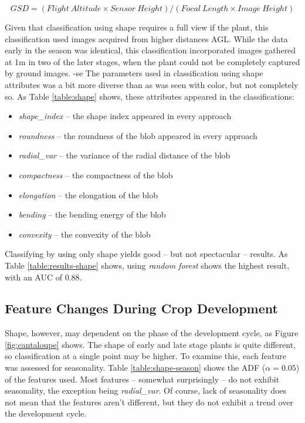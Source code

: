 \documentclass[letterpaper]{report}
\begin{document}
\begin{equation}
\label{eqn:gsd}
GSD = (Flight\ Altitude \times Sensor\ Height) / (Focal\ Length \times Image\ Height)
\end{equation}

Given that classification using shape requires a full view if the plant, this classification used images acquired from higher distances AGL. While the data early in the season was identical, this classification incorporated images gathered at 1m in two of the later stages, when the plant could not be completely captured by ground images.
-se
The parameters used in classification using shape attributes was a bit more diverse than as was seen with color, but not completely so. As Table \ref{table:shape} shows, these attributes appeared in the classifications:
\begin{itemize}
	\item{\textit{shape\_index} -- the shape index appeared in every approach}
	\item{\textit{roundness} -- the roundness of the blob appeared in every approach}
	\item{\textit{radial\_var} -- the variance of the radial distance of the blob}
	\item{\textit{compactness} -- the compactness of the blob}
	\item{\textit{elongation} -- the elongation of the blob}
	\item{\textit{bending} -- the bending energy of the blob}
	\item{\textit{convexity} -- the convexity of the blob}
\end{itemize}

Classifying by using only shape yields good -- but not spectacular -- results. As Table \ref{table:results-shape} shows, using \textit{random forest} shows the highest result, with an AUC of 0.88. 

{
\renewcommand{\arraystretch}{0.9}

}

\subsection{Feature Changes During Crop Development}
Shape, however, may dependent on the phase of the development cycle, as Figure \ref{fig:cantaloupe} shows. The shape of early and late stage plants is quite different, so classification at a single point may be higher.  To examine this, each feature was assessed for seasonality. Table \ref{table:shape-season} shows the ADF ($\alpha = 0.05$) of the features used.  Most features -- somewhat surprisingly -- do not exhibit seasonality, the exception being \textit{radial\_var}. Of course, lack of seasonality does not mean that the features aren't different, but they do not exhibit a trend over the development cycle.
\end{document}
